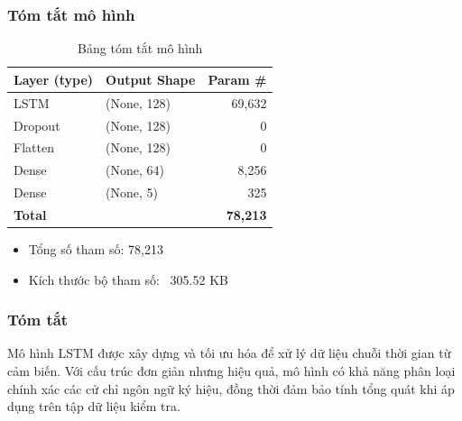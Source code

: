 \subsubsection{Tóm tắt mô hình}

\begin{table}[h]
\centering
\caption{Bảng tóm tắt mô hình}
\begin{tabular}{|l|l|r|}
\hline
\textbf{Layer (type)} & \textbf{Output Shape} & \textbf{Param \#} \\ \hline
LSTM                 & (None, 128)            & 69,632           \\ \hline
Dropout              & (None, 128)            & 0                \\ \hline
Flatten              & (None, 128)            & 0                \\ \hline
Dense                & (None, 64)             & 8,256            \\ \hline
Dense                & (None, 5)              & 325              \\ \hline      
\textbf{Total}       &                        & \textbf{78,213}  \\ \hline
\end{tabular}

\end{table}

\begin{itemize}
    \item Tổng số tham số: 78,213
    \item Kích thước bộ tham số: ~305.52 KB  
\end{itemize}


\subsubsection{Tóm tắt}

Mô hình LSTM được xây dựng và tối ưu hóa để xử lý dữ liệu chuỗi thời gian từ cảm biến. Với cấu trúc đơn giản nhưng hiệu quả, mô hình có khả năng phân loại chính xác các cử chỉ ngôn ngữ ký hiệu, đồng thời đảm bảo tính tổng quát khi áp dụng trên tập dữ liệu kiểm tra.











